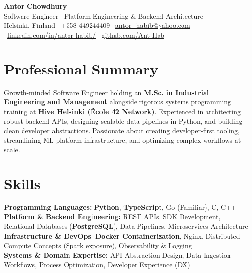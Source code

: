 \documentclass[a4paper,11pt]{article}
\begin{document}
\vspace*{2pt}

\begin{center}
    {\Huge {}\selectfont \textbf{Antor Chowdhury}} \\[4pt]
    {\large {}\selectfont Software Engineer \textbar\ Platform Engineering \& Backend Architecture} \\[4pt]
    \small
    Helsinki, Finland \textbar\ +358 449244409 \textbar\ 
    \href{mailto:antor_habib@yahoo.com}{\underline{antor\_habib@yahoo.com}} \textbar\ 
    \href{https://www.linkedin.com/in/antor-habib/}{\underline{linkedin.com/in/antor-habib/}} \textbar\ 
    \href{https://github.com/Ant-Hab}{\underline{github.com/Ant-Hab}}
\end{center}

\vspace{-2pt}

\section{Professional Summary}
\begin{justify}
\small{
Growth-minded Software Engineer holding an \textbf{M.Sc. in Industrial Engineering and Management} alongside rigorous systems programming training at \textbf{Hive Helsinki (École 42 Network)}. Experienced in architecting robust backend APIs, designing scalable data pipelines in Python, and building clean developer abstractions. Passionate about creating developer-first tooling, streamlining ML platform infrastructure, and optimizing complex workflows at scale.
}
\end{justify}

\vspace{-6pt}

\section{Skills}
\begin{itemize}[leftmargin=0.15in, label={}, itemsep=0pt, topsep=1pt]
\small{\item{
\textbf{Programming Languages:} \textbf{Python}, \textbf{TypeScript}, Go (Familiar), C, C++ \\
\textbf{Platform \& Backend Engineering:} REST APIs, SDK Development, Relational Databases (\textbf{PostgreSQL}), Data Pipelines, Microservices Architecture \\
\textbf{Infrastructure \& DevOps:} \textbf{Docker Containerization}, Nginx, Distributed Compute Concepts (Spark exposure), Observability \& Logging \\
\textbf{Systems \& Domain Expertise:} API Abstraction Design, Data Ingestion Workflows, Process Optimization, Developer Experience (DX)
}}
\end{itemize}
\end{document}
